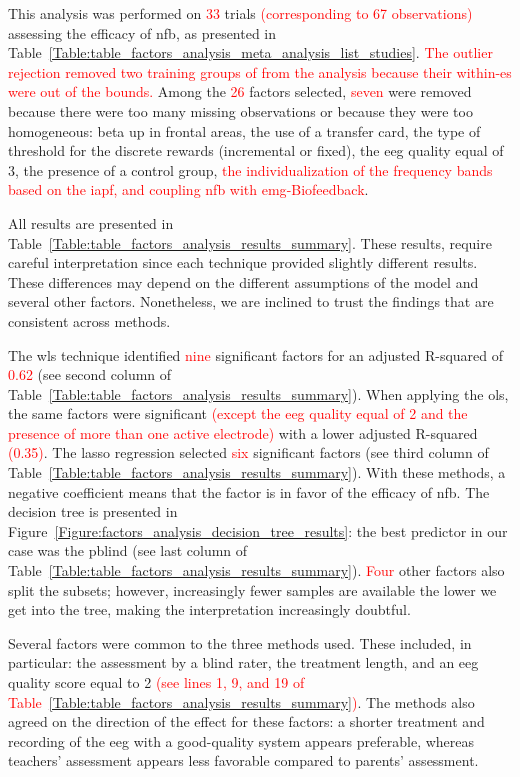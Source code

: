 This analysis was performed on \textcolor{red}{33} trials \textcolor{red}{(corresponding to 67 observations)} assessing the efficacy of \gls{nfb}, as presented 
in Table~\ref{Table:table_factors_analysis_meta_analysis_list_studies}. \textcolor{red}{The outlier rejection removed two training groups
of \citet{Bazanova2018} from the analysis because their within-\gls{es} were out of the bounds.} Among the \textcolor{red}{26} 
factors selected, \textcolor{red}{seven} were removed because there were too many missing observations or because they were too homogeneous: beta up in frontal areas, 
the use of a transfer card, the type of threshold for the discrete rewards (incremental or fixed), the \gls{eeg} quality equal of 3, the 
presence of a control group, \textcolor{red}{the individualization of the frequency bands based on the \gls{iapf}, and coupling 
\gls{nfb} with \gls{emg}-Biofeedback}.  

All results are presented in Table~\ref{Table:table_factors_analysis_results_summary}. These results, require 
careful interpretation since each technique provided slightly different results. These differences 
may depend on the different assumptions of the model and several other factors. Nonetheless, we are inclined to 
trust the findings that are consistent across methods. 

The \gls{wls} technique identified \textcolor{red}{nine} significant factors for an adjusted R-squared of \textcolor{red}{0.62} (see second column of 
Table~\ref{Table:table_factors_analysis_results_summary}). 
When applying the \gls{ols}, the same factors were significant \textcolor{red}{(except the \gls{eeg} quality equal of 2 and the presence of more than one active electrode)}
with a lower adjusted R-squared \textcolor{red}{(0.35)}. The \gls{lasso} regression selected \textcolor{red}{six} significant factors (see third column of 
Table~\ref{Table:table_factors_analysis_results_summary}). With these methods, a negative coefficient means 
that the factor is in favor of the efficacy of \gls{nfb}. The decision tree is presented in Figure~\ref{Figure:factors_analysis_decision_tree_results}: 
the best predictor in our case was the \gls{pblind} (see last column of 
Table~\ref{Table:table_factors_analysis_results_summary}). \textcolor{red}{Four} other factors also split the subsets; however, 
increasingly fewer samples are available the lower we get into the tree, making the interpretation increasingly doubtful.  

Several factors were common to the three methods used. These included, in particular: the assessment 
by a blind rater, the treatment length, and an \gls{eeg} quality score equal to 2 \textcolor{red}{(see lines 1, 9, and 19 of 
Table~\ref{Table:table_factors_analysis_results_summary})}.
The methods also agreed on the direction of the effect for these factors: 
a shorter treatment and recording of the \gls{eeg} with a good-quality system appears preferable, whereas teachers' assessment appears less favorable 
compared to parents' assessment.

